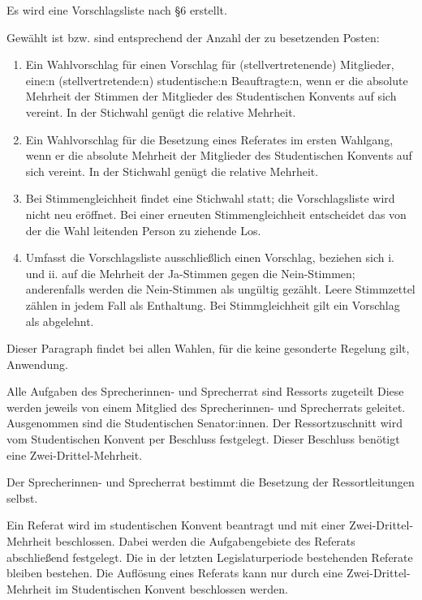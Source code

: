\documentclass[10pt,a4paper]{scrartcl}
\begin{document}
\begin{contract}
Es wird eine Vorschlagsliste nach §6
erstellt.

Gewählt ist bzw. sind entsprechend der Anzahl der zu
besetzenden Posten: 
\begin{enumerate}
\item Ein Wahlvorschlag für einen Vorschlag für
(stellvertretenende) Mitglieder, eine:n (stellvertretende:n)
studentische:n Beauftragte:n, wenn er die absolute Mehrheit der Stimmen
der Mitglieder des Studentischen Konvents auf sich vereint. In der
Stichwahl genügt die relative Mehrheit. 
\item Ein Wahlvorschlag für die
Besetzung eines Referates im ersten Wahlgang, wenn er die absolute
Mehrheit der Mitglieder des Studentischen Konvents auf sich vereint. In
der Stichwahl genügt die relative Mehrheit.
\item Bei Stimmengleichheit
findet eine Stichwahl statt; die Vorschlagsliste wird nicht neu
eröffnet. Bei einer erneuten Stimmengleichheit entscheidet das von der
die Wahl leitenden Person zu ziehende Los.
\item Umfasst die
Vorschlagsliste ausschließlich einen Vorschlag, beziehen sich i. und ii.
auf die Mehrheit der Ja-Stimmen gegen die Nein-Stimmen; anderenfalls
werden die Nein-Stimmen als ungültig gezählt. Leere Stimmzettel zählen
in jedem Fall als Enthaltung. Bei Stimmgleichheit gilt ein Vorschlag als
abgelehnt.
\end{enumerate}

Dieser Paragraph findet bei allen Wahlen, für die keine
gesonderte Regelung gilt, Anwendung.


\label{der-sprecherinnen--und-sprecherrat}

Alle Aufgaben des Sprecherinnen- und Sprecherrat sind Ressorts zugeteilt Diese
werden jeweils von einem Mitglied des Sprecherinnen- und Sprecherrats geleitet.
Ausgenommen sind die Studentischen Senator:innen. Der Ressortzuschnitt wird
vom Studentischen Konvent per Beschluss festgelegt. Dieser Beschluss benötigt
eine Zwei-Drittel-Mehrheit.

Der Sprecherinnen- und Sprecherrat bestimmt die Besetzung der Ressortleitungen
selbst.

Ein Referat wird im studentischen Konvent beantragt und mit einer
Zwei-Drittel-Mehrheit beschlossen. Dabei werden die Aufgabengebiete des Referats
abschließend festgelegt. Die in der letzten Legislaturperiode bestehenden
Referate bleiben bestehen. Die Auflösung eines Referats kann nur durch eine
Zwei-Drittel-Mehrheit im Studentischen Konvent beschlossen werden.


\end{contract}
\end{document}
